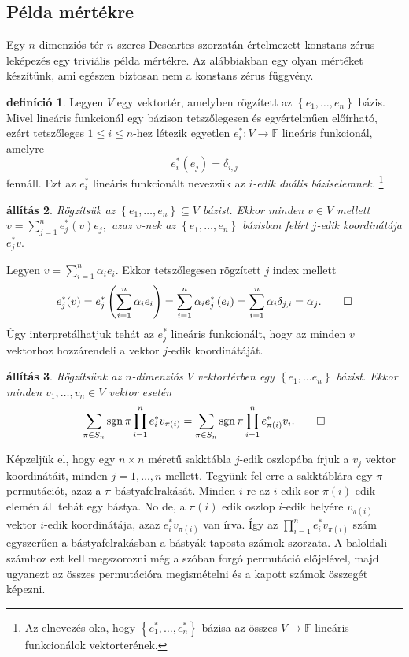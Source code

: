 \documentclass[9pt, a4paper, showtrims]{memoir}
\makeatletter
\renewenvironment{proof}[1][\proofname]
    {\par\pushQED{\qed}%
    \normalfont \topsep6\p@\@plus6\p@\relax
    \trivlist
    \item[\hskip\labelsep
        \itshape
    #1\@addpunct{:}]\ignorespaces}
    {\popQED\endtrivlist\@endpefalse}
\theoremstyle{plain}
\newtheorem{proposition}{állítás}[chapter]
\theoremstyle{remark}
\theoremstyle{definition}
\newtheorem{definition}[proposition]{definíció}
\DeclareMathOperator{\sgn}{sgn}
\makeatother
\begin{document}
\subsection{Példa mértékre}
Egy $n$ dimenziós tér $n$-szeres Descartes-szorzatán értelmezett konstans zérus leképezés egy
triviális példa mértékre.
Az alábbiakban egy olyan mértéket készítünk, ami egészen biztosan nem a konstans zérus függvény.
\begin{definition}
	Legyen $V$ egy vektortér, amelyben rögzített az $\left\{ e_1,\ldots,e_n \right\}$
	bázis.
	Mivel lineáris funkcionál egy bázison tetszőlegesen és egyértelműen előírható,
	ezért tetszőleges $1\leq i\leq n$-hez létezik egyetlen $e_i^\ast:V\to\mathbb{F}$
	lineáris funkcionál, amelyre
	\[
		e_i^\ast(e_j)=\delta_{i,j}
	\]
	fennáll.
	Ezt az $e_i^\ast$ lineáris funkcionált nevezzük az \emph{$i$-edik duális báziselemnek.}%
	\footnote
	{
		Az elnevezés oka,
		hogy $\left\{ e_1^\ast,\ldots,e_n^\ast \right\}$ bázisa az összes $V\to\mathbb{F}$ lineáris funkcionálok vektorterének.
	}
\end{definition}
\begin{proposition}
	Rögzítsük az $\left\{ e_1,\ldots,e_n \right\}\subseteq V$ bázist.
	Ekkor minden $v\in V$ mellett
	\(
	v=\sum_{j=1}^ne_j^\ast(v)e_j,
	\)
	azaz $v$-nek az $\left\{ e_1,\ldots,e_n \right\}$ bázisban felírt $j$-edik koordinátája $e_j^\ast v.$
\end{proposition}
\begin{proof}
	Legyen $v=\sum_{i=1}^n\alpha_ie_i$.
	Ekkor tetszőlegesen rögzített $j$ index mellett
	\[
	e_j^\ast(v)
	=
	e_j^\ast\left( \sum_{i=1}^n\alpha_ie_i \right)
	=
	\sum_{i=1}^n\alpha_ie_j^\ast\left( e_i \right)
	=
	\sum_{i=1}^n\alpha_i\delta_{j,i}
	=
	\alpha_j.
    \qedhere
    \]
\end{proof}
Úgy interpretálhatjuk tehát az $e_j^\ast$ lineáris funkcionált,
hogy az minden $v$ vektorhoz hozzárendeli a vektor $j$-edik koordinátáját.
\begin{proposition}
	Rögzítsünk az $n$-dimenziós $V$ vektortérben egy $\left\{ e_{1},\ldots e_{n}\right\} $ bázist.
	Ekkor minden $v_1,\ldots,v_n\in V$ vektor esetén
	\[
		\sum_{\pi \in S_{n}}\sgn\pi\prod_{i=1}^{n}e_{i}^{\ast }v_{\pi \left( i\right)}
		=
		\sum_{\pi \in S_{n}}\sgn\pi\prod_{i=1}^{n}e_{\pi \left( i\right)}^{\ast }v_{i}.
	    \qedhere
	\]
\end{proposition}
Képzeljük el, hogy egy $n\times n$ méretű sakktábla $j$-edik oszlopába írjuk a $v_j$ vektor koordinátáit,
minden $j=1,\ldots,n$ mellett.
Tegyünk fel erre a sakktáblára egy $\pi$ permutációt, azaz a $\pi$ bástyafelrakását.
Minden $i$-re az $i$-edik sor $\pi\left( i \right)$-edik elemén áll tehát egy bástya.
No de, a $\pi\left( i \right)$ edik oszlop $i$-edik helyére $v_{\pi\left( i \right)}$ vektor $i$-edik koordinátája,
azaz $e_i^\ast v_{\pi(i)}$ van írva.
Így az $\prod_{i=1}^n e_i^\ast v_{\pi\left( i \right)}$ szám egyszerűen a bástyafelrakásban a bástyák taposta számok szorzata.
A baloldali számhoz ezt kell megszorozni még a szóban forgó permutáció előjelével,
majd ugyanezt az összes permutációra megismételni és a kapott számok összegét képezni.
\end{document}
